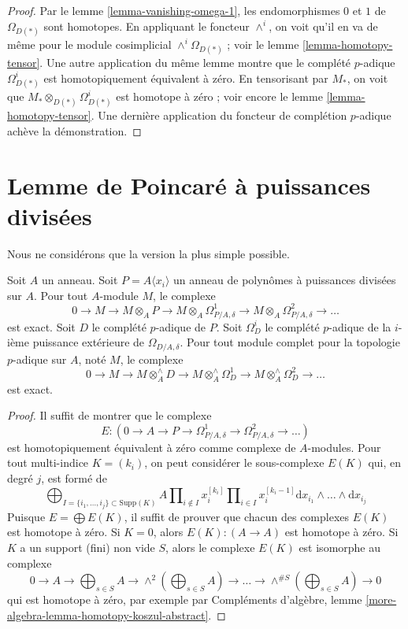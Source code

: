 \begin{proof}
Par le lemme \ref{lemma-vanishing-omega-1}, les endomorphismes $0$ et $1$
de $\Omega_{D(*)}$ sont homotopes.
En appliquant le foncteur $\wedge^i$, on voit qu'il
en va de même pour le module cosimplicial $\wedge^i\Omega_{D(*)}$ ; voir le
lemme \ref{lemma-homotopy-tensor}.
Une autre application du même lemme montre que le complété $p$-adique
$\Omega^i_{D(*)}$ est homotopiquement équivalent à zéro.
En tensorisant par $M_*$, on voit que $M_* \otimes_{D(*)} \Omega^i_{D(*)}$
est homotope à zéro ; voir encore le lemme \ref{lemma-homotopy-tensor}.
Une dernière application du foncteur de complétion $p$-adique achève la démonstration.
\end{proof}



\section{Lemme de Poincar\'e à puissances divisées}
\label{section-poincare}

\noindent
Nous ne considérons que la version la plus simple possible.

\begin{lemma}
\label{lemma-poincare}
Soit $A$ un anneau. Soit $P = A\langle x_i \rangle$ un anneau de polynômes
à puissances divisées sur $A$. Pour tout $A$-module $M$, le complexe
$$
0 \to M \to
M \otimes_A P \to
M \otimes_A \Omega^1_{P/A, \delta} \to
M \otimes_A \Omega^2_{P/A, \delta} \to \ldots
$$
est exact. Soit $D$ le complété $p$-adique de $P$.
Soit $\Omega^i_D$ le complété $p$-adique de la $i$-ième puissance
extérieure de $\Omega_{D/A, \delta}$. Pour tout module complet pour la topologie $p$-adique sur
$A$, noté $M$, le complexe
$$
0 \to M \to
M \otimes^\wedge_A D \to
M \otimes^\wedge_A \Omega^1_D \to
M \otimes^\wedge_A \Omega^2_D \to \ldots
$$
est exact.
\end{lemma}

\begin{proof}
Il suffit de montrer que le complexe
$$
E :
(0 \to A \to P \to \Omega^1_{P/A, \delta} \to
\Omega^2_{P/A, \delta} \to \ldots)
$$
est homotopiquement équivalent à zéro comme complexe de $A$-modules.
Pour tout multi-indice $K = (k_i)$, on peut considérer le sous-complexe $E(K)$
qui, en degré $j$, est formé de
$$
\bigoplus\nolimits_{I = \{i_1, \ldots, i_j\} \subset \text{Supp}(K)}
A
\prod\nolimits_{i \not \in I} x_i^{[k_i]}
\prod\nolimits_{i \in I} x_i^{[k_i - 1]}
\text{d}x_{i_1} \wedge \ldots \wedge \text{d}x_{i_j}
$$
Puisque $E = \bigoplus E(K)$, il suffit de prouver que chacun des
complexes $E(K)$ est homotope à zéro. Si $K = 0$, alors
$E(K) : (A \to A)$ est homotope à zéro. Si $K$ a un support (fini) non vide
$S$, alors le complexe $E(K)$ est isomorphe au complexe
$$
0 \to A \to
\bigoplus\nolimits_{s \in S} A \to
\wedge^2(\bigoplus\nolimits_{s \in S} A) \to
\ldots \to \wedge^{\# S}(\bigoplus\nolimits_{s \in S} A) \to 0
$$
qui est homotope à zéro, par exemple par
Compléments d'algèbre, lemme \ref{more-algebra-lemma-homotopy-koszul-abstract}.
\end{proof}

